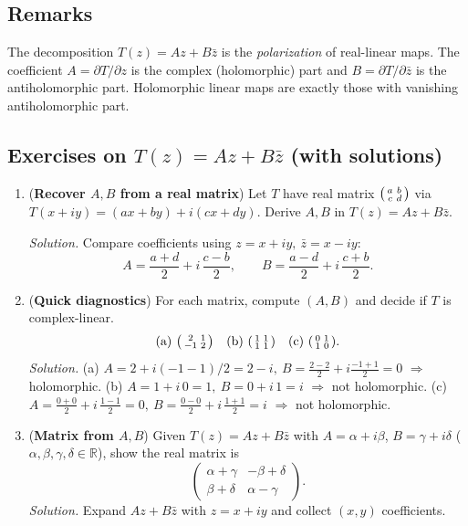 \documentclass[11pt,a4paper]{article}
\theoremstyle{definition}
\theoremstyle{definition}
\theoremstyle{plain}
\theoremstyle{remark}
\begin{document}
\subsection*{Remarks}
The decomposition $T(z)=Az+B\bar z$ is the \emph{polarization} of real-linear maps.
The coefficient $A=\partial T/\partial z$ is the complex (holomorphic) part and
$B=\partial T/\partial\bar z$ is the antiholomorphic part. Holomorphic linear maps
are exactly those with vanishing antiholomorphic part.

\subsection*{Exercises on $T(z)=Az+B\bar z$ (with solutions)}

\begin{enumerate}
	\item (\textbf{Recover $A,B$ from a real matrix})  
	Let $T$ have real matrix $\begin{psmallmatrix}a&b\\ c&d\end{psmallmatrix}$ via
	$T(x+iy)=(ax+by)+i(cx+dy)$. Derive $A,B$ in $T(z)=Az+B\bar z$.
	
	\emph{Solution.} Compare coefficients using $z=x+iy,\ \bar z=x-iy$:
	\[
	A=\frac{a+d}{2}+i\,\frac{c-b}{2},\qquad
	B=\frac{a-d}{2}+i\,\frac{c+b}{2}.
	\]
	
	\item (\textbf{Quick diagnostics})  
	For each matrix, compute $(A,B)$ and decide if $T$ is complex-linear.
	\[
	\text{(a) }\begin{psmallmatrix}2&1\\ -1&2\end{psmallmatrix}\quad
	\text{(b) }\begin{psmallmatrix}1&1\\ 1&1\end{psmallmatrix}\quad
	\text{(c) }\begin{psmallmatrix}0&1\\ 1&0\end{psmallmatrix}.
	\]
	\emph{Solution.}
	(a) $A=2+i(-1-1)/2=2-i,\ B=\tfrac{2-2}{2}+i\tfrac{-1+1}{2}=0$ $\Rightarrow$ holomorphic.  
	(b) $A=1+i\,0=1,\ B=0+i\,1=i$ $\Rightarrow$ not holomorphic.  
	(c) $A=\tfrac{0+0}{2}+i\,\tfrac{1-1}{2}=0,\ B=\tfrac{0-0}{2}+i\,\tfrac{1+1}{2}=i$ $\Rightarrow$ not holomorphic.
	
	\item (\textbf{Matrix from $A,B$})  
	Given $T(z)=Az+B\bar z$ with $A=\alpha+i\beta$, $B=\gamma+i\delta$ ($\alpha,\beta,\gamma,\delta\in\mathbb{R}$), show the real matrix is
	\[
	\begin{pmatrix}
		\alpha+\gamma & -\beta+\delta\\
		\beta+\delta & \alpha-\gamma
	\end{pmatrix}.
	\]
	\emph{Solution.} Expand $Az+B\bar z$ with $z=x+iy$ and collect $(x,y)$ coefficients.
	

\end{enumerate}
\end{document}

